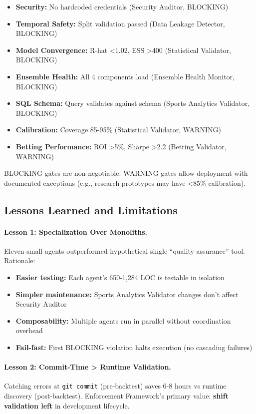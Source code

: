 \begin{itemize}[itemsep=2pt,parsep=0pt]
    \item \textbf{Security:} No hardcoded credentials (Security Auditor, BLOCKING)
    \item \textbf{Temporal Safety:} Split validation passed (Data Leakage Detector, BLOCKING)
    \item \textbf{Model Convergence:} R-hat <1.02, ESS >400 (Statistical Validator, BLOCKING)
    \item \textbf{Ensemble Health:} All 4 components load (Ensemble Health Monitor, BLOCKING)
    \item \textbf{SQL Schema:} Query validates against schema (Sports Analytics Validator, BLOCKING)
    \item \textbf{Calibration:} Coverage 85-95\% (Statistical Validator, WARNING)
    \item \textbf{Betting Performance:} ROI >5\%, Sharpe >2.2 (Betting Validator, WARNING)
\end{itemize}

BLOCKING gates are non-negotiable. WARNING gates allow deployment with documented exceptions (e.g., research prototypes may have <85\% calibration).

\subsection{Lessons Learned and Limitations}

\paragraph{Lesson 1: Specialization Over Monoliths.}
Eleven small agents outperformed hypothetical single ``quality assurance'' tool. Rationale:

\begin{itemize}[itemsep=2pt,parsep=0pt]
    \item \textbf{Easier testing:} Each agent's 650-1,284 LOC is testable in isolation
    \item \textbf{Simpler maintenance:} Sports Analytics Validator changes don't affect Security Auditor
    \item \textbf{Composability:} Multiple agents run in parallel without coordination overhead
    \item \textbf{Fail-fast:} First BLOCKING violation halts execution (no cascading failures)
\end{itemize}

\paragraph{Lesson 2: Commit-Time > Runtime Validation.}
Catching errors at \texttt{git commit} (pre-backtest) saves 6-8 hours vs runtime discovery (post-backtest). Enforcement Framework's primary value: \textbf{shift validation left} in development lifecycle.

